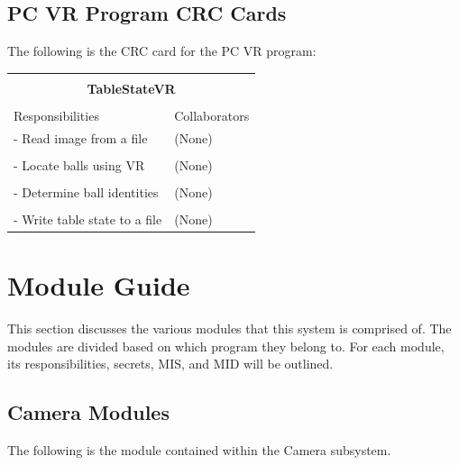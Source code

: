 \documentclass[titlepage]{article}
\begin{document}
\subsection{PC VR Program CRC Cards}
The following is the CRC card for the PC VR program:\\
\begin{table}[!htbp]
\centering
\begin{tabular}{| p{} | p{} |}\hline
	\multicolumn{2}{|l|}{}\\
	\multicolumn{2}{|c|}{\large{\textbf{TableStateVR}}}\\
	\multicolumn{2}{|l|}{}\\\hline
	\vspace{0mm}\large{Responsibilities}\vspace{2mm} &\vspace{0mm}\large{Collaborators}\vspace{2mm}\\\hline
	\vspace{0mm}- Read image from a file		&\vspace{0mm}(None)\\&\\
	- Locate balls using VR						&(None)\\&\\
	- Determine ball identities					&(None)\\&\\
	- Write table state to a file\vspace{2mm}	&(None)\vspace{2mm}\\\hline
\end{tabular}
\end{table}



\section{Module Guide}
This section discusses the various modules that this system is comprised of. The modules are divided based on which program they belong to. For each module, its responsibilities, secrets, MIS, and MID will be outlined.
\subsection{Camera Modules}
The following is the module contained within the Camera subsystem.
\end{document}
